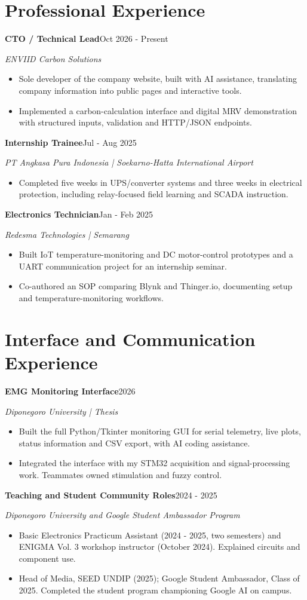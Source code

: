 \documentclass[11pt,a4paper]{article}
\newcommand{\entry}[3]{\Needspace{4\baselineskip}\textbf{#1}\hfill #2\par\textit{#3}\par}
\begin{document}
\section{Professional Experience}
\entry{CTO / Technical Lead}{Oct 2026 - Present}{ENVIID Carbon Solutions}
\begin{itemize}
\item Sole developer of the company website, built with AI assistance, translating company information into public pages and interactive tools.
\item Implemented a carbon-calculation interface and digital MRV demonstration with structured inputs, validation and HTTP/JSON endpoints.
\end{itemize}
\entry{Internship Trainee}{Jul - Aug 2025}{PT Angkasa Pura Indonesia | Soekarno-Hatta International Airport}
\begin{itemize}
\item Completed five weeks in UPS/converter systems and three weeks in electrical protection, including relay-focused field learning and SCADA instruction.
\end{itemize}
\entry{Electronics Technician}{Jan - Feb 2025}{Redesma Technologies | Semarang}
\begin{itemize}
\item Built IoT temperature-monitoring and DC motor-control prototypes and a UART communication project for an internship seminar.
\item Co-authored an SOP comparing Blynk and Thinger.io, documenting setup and temperature-monitoring workflows.
\end{itemize}
\section{Interface and Communication Experience}
\entry{EMG Monitoring Interface}{2026}{Diponegoro University | Thesis}
\begin{itemize}
\item Built the full Python/Tkinter monitoring GUI for serial telemetry, live plots, status information and CSV export, with AI coding assistance.
\item Integrated the interface with my STM32 acquisition and signal-processing work. Teammates owned stimulation and fuzzy control.
\end{itemize}
\entry{Teaching and Student Community Roles}{2024 - 2025}{Diponegoro University and Google Student Ambassador Program}
\begin{itemize}
\item Basic Electronics Practicum Assistant (2024 - 2025, two semesters) and ENIGMA Vol. 3 workshop instructor (October 2024). Explained circuits and component use.
\item Head of Media, SEED UNDIP (2025); Google Student Ambassador, Class of 2025. Completed the student program championing Google AI on campus.
\end{itemize}
\end{document}
